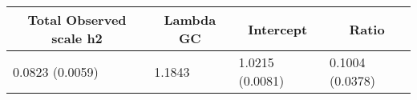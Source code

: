 \begin{center}
\begin{tabular}{llll}
\hline\hline
\multicolumn{1}{c}{Total Observed scale h2}&\multicolumn{1}{c}{Lambda GC}&\multicolumn{1}{c}{Intercept}&\multicolumn{1}{c}{Ratio}\tabularnewline
\hline
0.0823 (0.0059)&1.1843&1.0215 (0.0081)&0.1004 (0.0378)\tabularnewline
\hline
\end{tabular}\end{center}
